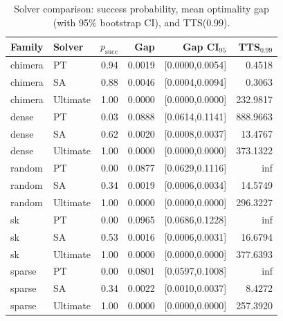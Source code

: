\begin{table}[t]
  \centering
  \caption{Solver comparison: success probability, mean optimality gap (with 95\% bootstrap CI), and TTS(0.99).}
  \begin{tabular}{llrrrr}
    \toprule
    Family & Solver & $p_\mathrm{succ}$ & Gap & Gap CI$_{95}$ & TTS$_{0.99}$ \\
    \midrule
    chimera & PT & 0.94 & 0.0019 & [0.0000,0.0054] & 0.4518 \\
    chimera & SA & 0.88 & 0.0046 & [0.0004,0.0094] & 0.3063 \\
    chimera & Ultimate & 1.00 & 0.0000 & [0.0000,0.0000] & 232.9817 \\
    dense & PT & 0.03 & 0.0888 & [0.0614,0.1141] & 888.9663 \\
    dense & SA & 0.62 & 0.0020 & [0.0008,0.0037] & 13.4767 \\
    dense & Ultimate & 1.00 & 0.0000 & [0.0000,0.0000] & 373.1322 \\
    random & PT & 0.00 & 0.0877 & [0.0629,0.1116] & inf \\
    random & SA & 0.34 & 0.0019 & [0.0006,0.0034] & 14.5749 \\
    random & Ultimate & 1.00 & 0.0000 & [0.0000,0.0000] & 296.3227 \\
    sk & PT & 0.00 & 0.0965 & [0.0686,0.1228] & inf \\
    sk & SA & 0.53 & 0.0016 & [0.0006,0.0031] & 16.6794 \\
    sk & Ultimate & 1.00 & 0.0000 & [0.0000,0.0000] & 377.6393 \\
    sparse & PT & 0.00 & 0.0801 & [0.0597,0.1008] & inf \\
    sparse & SA & 0.34 & 0.0022 & [0.0010,0.0037] & 8.4272 \\
    sparse & Ultimate & 1.00 & 0.0000 & [0.0000,0.0000] & 257.3920 \\
    \bottomrule
  \end{tabular}
\end{table}

